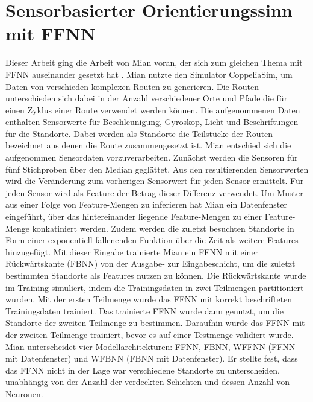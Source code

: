 \section{Sensorbasierter Orientierungssinn mit FFNN}
Dieser Arbeit ging die Arbeit von Mian voran, der sich zum gleichen Thema mit FFNN auseinander gesetzt hat \cite{naveedThesis}.
Mian nutzte den Simulator CoppeliaSim, um Daten von verschieden komplexen Routen zu generieren.
Die Routen unterschieden sich dabei in der Anzahl verschiedener Orte und Pfade die für einen Zyklus einer Route verwendet werden können.
Die aufgenommenen Daten enthalten Sensorwerte für Beschleunigung, Gyroskop, Licht und Beschriftungen für die Standorte.
Dabei werden als Standorte die Teilstücke der Routen bezeichnet aus denen die Route zusammengesetzt ist.
\newline
\newline
Mian entschied sich die aufgenommen Sensordaten vorzuverarbeiten.
Zunächst werden die Sensoren für fünf Stichproben über den Median geglättet.
Aus den resultierenden Sensorwerten wird die Veränderung zum vorherigen Sensorwert für jeden Sensor ermittelt.
Für jeden Sensor wird als Feature der Betrag dieser Differenz verwendet.
Um Muster aus einer Folge von Feature-Mengen zu inferieren hat Mian ein Datenfenster eingeführt, über das
hintereinander liegende Feature-Mengen zu einer Feature-Menge konkatiniert werden.
Zudem werden die zuletzt besuchten Standorte in Form einer exponentiell fallenenden Funktion über die Zeit als weitere Features hinzugefügt.
\newline
\newline
Mit dieser Eingabe trainierte Mian ein FFNN mit einer Rückwärtskante (FBNN) von der Ausgabe- zur Eingabeschicht,
um die zuletzt bestimmten Standorte als Features nutzen zu können.
Die Rückwärtskante wurde im Training simuliert, indem die Trainingsdaten in zwei Teilmengen partitioniert wurden.
Mit der ersten Teilmenge wurde das FFNN mit korrekt beschrifteten Trainingsdaten trainiert.
Das trainierte FFNN wurde dann genutzt, um die Standorte der zweiten Teilmenge zu bestimmen.
Daraufhin wurde das FFNN mit der zweiten Teilmenge trainiert, bevor es auf einer Testmenge validiert wurde.
\newline
\newline
Mian unterscheidet vier Modellarchitekturen: FFNN, FBNN, WFFNN (FFNN mit Datenfenster) und WFBNN (FBNN mit Datenfenster).
Er stellte fest, dass das FFNN nicht in der Lage war verschiedene Standorte zu unterscheiden,
unabhängig von der Anzahl der verdeckten Schichten und dessen Anzahl von Neuronen.
